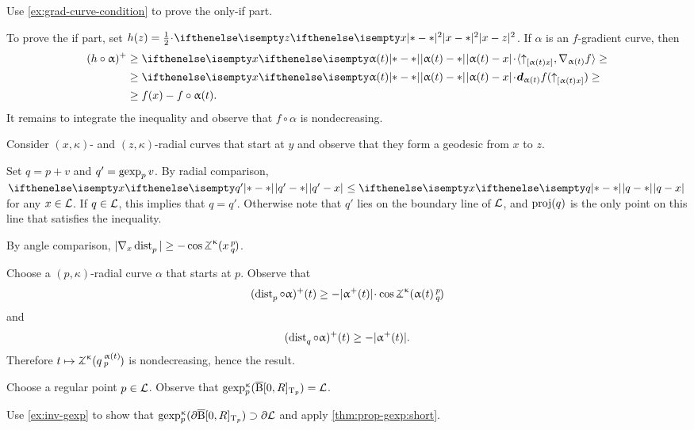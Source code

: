 Use \ref{ex:grad-curve-condition} to prove the only-if part.

To prove the if part, set $h(z)=\tfrac12\cdot\dist[2]{x}{z}{}$.
If $\alpha$ is an $f$-gradient curve, then 
\begin{align*}
(h\circ\alpha)^+&\ge \dist{\alpha(t)}{x}{}\cdot\langle\dir{\alpha(t)}{x},\nabla_{\alpha(t)}f\rangle\ge
\\
&\ge \dist{\alpha(t)}{x}{}\cdot\dd_{\alpha(t)}f(\dir{\alpha(t)}{x})\ge 
\\
&\ge f(x)-f\circ\alpha(t).
\end{align*}
It remains to integrate the inequality and observe that $f\circ\alpha$ is nondecreasing.

Consider $(x,\kappa)$- and $(z,\kappa)$-radial curves that start at $y$
and observe that they form a geodesic from $x$ to $z$.

 Set $q=p+v$ and $q'=\mathop{\rm gexp}\nolimits_pv$. 
By radial comparison, $\dist{q'}{x}{}\le \dist{q}{x}{}$ for any $x\in \spc{L}$.
If $q\in \spc{L}$, this implies that $q=q'$.
Otherwise note that $q'$ lies on the boundary line of $\mathcal{L}$, and $\mathop{\rm proj}\nolimits(q)$ is the only point on this line that satisfies the inequality.

By angle comparison,
$|\nabla_x\distfun p|\ge-\cos \angk\kappa xpq$.

Choose a $(p,\kappa)$-radial curve $\alpha$ that starts at $p$.
Observe that 
\[(\distfun p\circ \alpha)^+(t)\ge-|\alpha^+(t)|\cdot \cos \angk\kappa {\alpha(t)}p q\]
and
\[(\distfun q\circ\alpha)^+(t)\ge -|\alpha^+(t)|.\]
Therefore $t\mapsto\angk\kappa q{\alpha(t)}p$  is nondecreasing, hence the result.

Choose a regular point $p\in\spc{L}$.
Observe that $\gexp_p^\kappa(\cBall[\0,R]_{\T_p})\z=\spc{L}$.

Use \ref{ex:inv-gexp} to show that 
$\gexp_p^\kappa(\partial\cBall[\0,R]_{\T_p})\supset\partial\spc{L}$ and apply \ref{thm:prop-gexp:short}.

